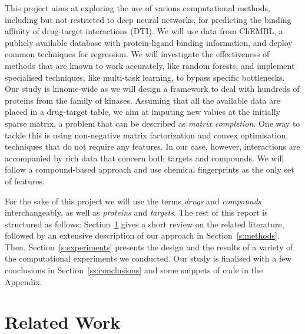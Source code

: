 \documentclass[10pt]{article}
\begin{document}
This project aims at exploring the use of various computational methods, including but not restricted to deep neural networks, for predicting the binding affinity of drug-target interactions (DTI). We will use data from ChEMBL, a publicly available database with protein-ligand binding information, and deploy common techniques for regression. We will investigate the effectiveness of methods that are known to work accurately, like random forests, and implement specialised techniques, like multi-task learning, to bypass specific bottlenecks. Our study is kinome-wide as we will design a framework to deal with hundreds of proteins from the family of kinases. Assuming that all the available data are placed in a drug-target table, we aim at imputing new values at the initially sparse matrix, a problem that can be described as \textit{matrix completion}. One way to tackle this is using non-negative matrix factorization and convex optimisation, techniques that do not require any features. In our case, however, interactions are accompanied by rich data that concern both targets and compounds. We will follow a compound-based approach and use chemical fingerprints as the only set of features.  

For the sake of this project we will use the terms \textit{drugs} and \textit{compounds} interchangeably, as well as \textit{proteins} and \textit{targets}. The rest of this report is structured as follows: Section~\ref{ss:relatedwork} gives a short review on the related literature, followed by an extensive description of our approach in Section~\ref{s:methods}. Then, Section~\ref{s:experiments} presents the design and the results of a variety of the computational experiments we conducted. Our study is finalised with a few conclusions in Section~\ref{ss:conclusions} and some snippets of code in the Appendix. 




\section{Related Work}
\label{ss:relatedwork}
\end{document}
